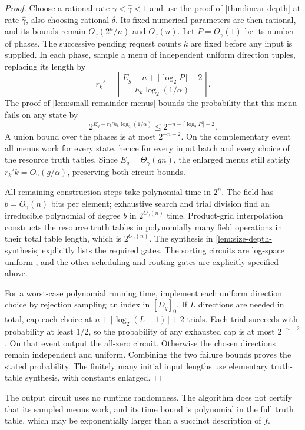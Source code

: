 \documentclass[11pt]{article}
\begin{document}
\begin{proof}
Choose a rational rate $\gamma<\widehat\gamma<1$ and use the proof of
\cref{thm:linear-depth} at rate $\widehat\gamma$, also choosing rational
$\delta$.  Its fixed numerical parameters are then rational, and its
bounds remain $O_\gamma(2^n/n)$ and $O_\gamma(n)$.
Let $P=O_\gamma(1)$ be its number of phases.  The successive pending
request counts $k$ are fixed before any input is supplied.  In each phase,
sample a menu of independent uniform direction tuples, replacing its
length by
\[
 r_k'=\left\lceil
 \frac{E_g+n+\lceil\log_2P\rceil+2}
      {h_k\log_2(1/\alpha)}
 \right\rceil.
\]
The proof of \cref{lem:small-remainder-menus} bounds the probability that
this menu fails on any state by
\[
 2^{E_g-r_k'h_k\log_2(1/\alpha)}
 \le 2^{-n-\lceil\log_2P\rceil-2}.
\]
A union bound over the phases is at most $2^{-n-2}$.  On the
complementary event all menus work for every state, hence for every
input batch and every choice of the resource truth tables.  Since
$E_g=\Theta_\gamma(gn)$, the enlarged menus still satisfy
$r_k'k=O_\gamma(g/\alpha)$, preserving both circuit bounds.

All remaining construction steps take polynomial time in $2^n$.
The field has $b=O_\gamma(n)$ bits per element; exhaustive search and
trial division find an irreducible polynomial of degree $b$ in
$2^{O_\gamma(n)}$ time.  Product-grid interpolation constructs
the resource truth tables in polynomially many field operations in their
total table length, which is $2^{O_\gamma(n)}$.  The synthesis in
\cref{lem:size-depth-synthesis} explicitly lists the required gates.
The sorting circuits are log-space uniform
\cite[Lemmas~8--9]{HolmgrenRothblum2024}, and the other scheduling and
routing gates are explicitly specified above.

For a worst-case polynomial running time, implement each uniform
direction choice by rejection sampling an index in $[D_q]_0$.
If $L$ directions are needed in total, cap each choice at
$n+\lceil\log_2(L+1)\rceil+2$ trials.  Each trial succeeds with probability
at least $1/2$, so the probability of any exhausted cap is at most
$2^{-n-2}$.  On that event output the all-zero circuit.  Otherwise the
chosen directions remain independent and uniform.  Combining the two
failure bounds proves the stated probability.  The finitely many initial
input lengths use elementary truth-table synthesis, with constants enlarged.
\end{proof}

The output circuit uses no runtime randomness.  The algorithm does not
certify that its sampled menus work, and its time bound is polynomial
in the full truth table, which may be exponentially larger than a
succinct description of $f$.
\end{document}
